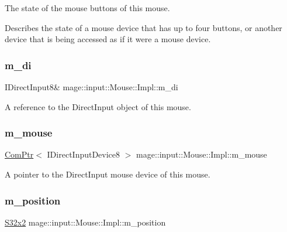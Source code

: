 The state of the mouse buttons of this mouse.

Describes the state of a mouse device that has up to four buttons, or another device that is being accessed as if it were a mouse device. \hypertarget{classmage_1_1input_1_1_mouse_1_1_impl_af356557a537747ee5c852dba02795931}{}\label{classmage_1_1input_1_1_mouse_1_1_impl_af356557a537747ee5c852dba02795931} 
\subsubsection{\texorpdfstring{m\+\_\+di}{m\_di}}
{\footnotesize\ttfamily I\+Direct\+Input8\& mage\+::input\+::\+Mouse\+::\+Impl\+::m\+\_\+di\hspace{0.3cm}{\ttfamily [private]}}

A reference to the Direct\+Input object of this mouse. \hypertarget{classmage_1_1input_1_1_mouse_1_1_impl_a1c5de7f34edab12846e75cf7d2b76094}{}\label{classmage_1_1input_1_1_mouse_1_1_impl_a1c5de7f34edab12846e75cf7d2b76094} 
\subsubsection{\texorpdfstring{m\+\_\+mouse}{m\_mouse}}
{\footnotesize\ttfamily \hyperlink{namespacemage_ae74f374780900893caa5555d1031fd79}{Com\+Ptr}$<$ I\+Direct\+Input\+Device8 $>$ mage\+::input\+::\+Mouse\+::\+Impl\+::m\+\_\+mouse\hspace{0.3cm}{\ttfamily [private]}}

A pointer to the Direct\+Input mouse device of this mouse. \hypertarget{classmage_1_1input_1_1_mouse_1_1_impl_aaf430602e56efbeeae8d46012be4437e}{}\label{classmage_1_1input_1_1_mouse_1_1_impl_aaf430602e56efbeeae8d46012be4437e} 
\subsubsection{\texorpdfstring{m\+\_\+position}{m\_position}}
{\footnotesize\ttfamily \hyperlink{namespacemage_a02de5a44f35ee9917e5788d63795fece}{S32x2} mage\+::input\+::\+Mouse\+::\+Impl\+::m\+\_\+position\hspace{0.3cm}{\ttfamily [private]}}


